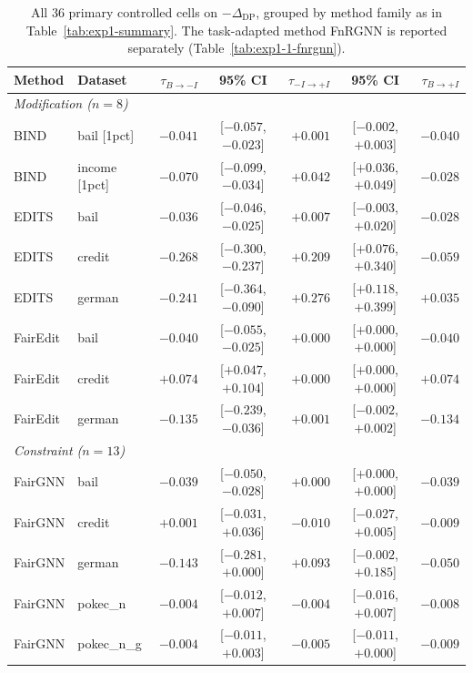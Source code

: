 \begin{table}[t]
\centering
\caption{All 36 primary controlled cells on $-\Delta_{\mathrm{DP}}$, grouped by method family as in Table~\ref{tab:exp1-summary}. The task-adapted method FnRGNN is reported separately (Table~\ref{tab:exp1-1-fnrgnn}).}
\label{tab:exp1-cells-negDP}
\scriptsize
\vspace{-0.2cm}
\begin{tabular}{llrcrcr}
\toprule
Method & Dataset & $\tau_{B\rightarrow -I}$ & 95\% CI & $\tau_{-I\rightarrow +I}$ & 95\% CI & $\tau_{B\rightarrow +I}$ \\
\midrule
\multicolumn{7}{l}{\textit{Modification ($n=8$)}} \\
BIND & bail [1pct] & $-0.041$ & [$-0.057$, $-0.023$] & $+0.001$ & [$-0.002$, $+0.003$] & $-0.040$ \\
BIND & income [1pct] & $-0.070$ & [$-0.099$, $-0.034$] & $\mathbf{+0.042}$ & [$+0.036$, $+0.049$] & $-0.028$ \\
\midrule
EDITS & bail & $-0.036$ & [$-0.046$, $-0.025$] & $+0.007$ & [$-0.003$, $+0.020$] & $-0.028$ \\
EDITS & credit & $-0.268$ & [$-0.300$, $-0.237$] & $\mathbf{+0.209}$ & [$+0.076$, $+0.340$] & $-0.059$ \\
EDITS & german & $-0.241$ & [$-0.364$, $-0.090$] & $\mathbf{+0.276}$ & [$+0.118$, $+0.399$] & $+0.035$ \\
\midrule
FairEdit & bail & $-0.040$ & [$-0.055$, $-0.025$] & $+0.000$ & [$+0.000$, $+0.000$] & $-0.040$ \\
FairEdit & credit & $+0.074$ & [$+0.047$, $+0.104$] & $+0.000$ & [$+0.000$, $+0.000$] & $+0.074$ \\
FairEdit & german & $-0.135$ & [$-0.239$, $-0.036$] & $+0.001$ & [$-0.002$, $+0.002$] & $-0.134$ \\
\midrule
\multicolumn{7}{l}{\textit{Constraint ($n=13$)}} \\
FairGNN & bail & $-0.039$ & [$-0.050$, $-0.028$] & $+0.000$ & [$+0.000$, $+0.000$] & $-0.039$ \\
FairGNN & credit & $+0.001$ & [$-0.031$, $+0.036$] & $-0.010$ & [$-0.027$, $+0.005$] & $-0.009$ \\
FairGNN & german & $-0.143$ & [$-0.281$, $+0.000$] & $+0.093$ & [$-0.002$, $+0.185$] & $-0.050$ \\
FairGNN & pokec\_n & $-0.004$ & [$-0.012$, $+0.007$] & $-0.004$ & [$-0.016$, $+0.007$] & $-0.008$ \\
FairGNN & pokec\_n\_g & $-0.004$ & [$-0.011$, $+0.003$] & $-0.005$ & [$-0.011$, $+0.000$] & $-0.009$ \\

\end{tabular}
\end{table}
